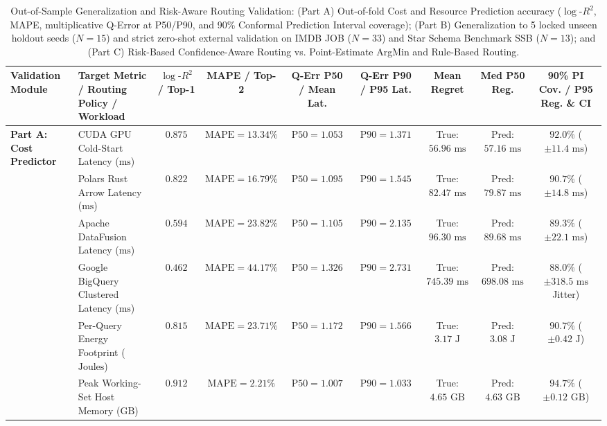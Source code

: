 \documentclass[10pt,a4paper]{article}
\begin{document}
\begin{table}[!t]
\centering
\caption{Out-of-Sample Generalization and Risk-Aware Routing Validation: (Part A) Out-of-fold Cost and Resource Prediction accuracy ($\log\text{-}R^2$, MAPE, multiplicative Q-Error at P50/P90, and 90\% Conformal Prediction Interval coverage); (Part B) Generalization to 5 locked unseen holdout seeds ($N=15$) and strict zero-shot external validation on IMDB JOB ($N=33$) and Star Schema Benchmark SSB ($N=13$); and (Part C) Risk-Based Confidence-Aware Routing vs. Point-Estimate ArgMin and Rule-Based Routing.}
\label{tab:priority3_validation}
\scriptsize
\setlength{\tabcolsep}{3.2pt}
\renewcommand{\arraystretch}{1.10}
\begin{tabular}{@{}llccccccc@{}}
\toprule
\textbf{Validation Module} & \textbf{Target Metric / Routing Policy / Workload} & \textbf{$\log\text{-}R^2$ / Top-1} & \textbf{MAPE / Top-2} & \textbf{Q-Err P50 / Mean Lat.} & \textbf{Q-Err P90 / P95 Lat.} & \textbf{Mean Regret} & \textbf{Med P50 Reg.} & \textbf{90\% PI Cov. / P95 Reg. \& CI} \\
\midrule
\multirow{6}{*}{\textbf{Part A: Cost Predictor}}
 & CUDA GPU Cold-Start Latency ($\text{ms}$) & $0.875$ & $\text{MAPE}=13.34\%$ & $\text{P50}=1.053$ & $\text{P90}=1.371$ & True: $56.96\text{ ms}$ & Pred: $57.16\text{ ms}$ & $92.0\%$ ($\pm 11.4\text{ ms}$) \\
 & Polars Rust Arrow Latency ($\text{ms}$) & $0.822$ & $\text{MAPE}=16.79\%$ & $\text{P50}=1.095$ & $\text{P90}=1.545$ & True: $82.47\text{ ms}$ & Pred: $79.87\text{ ms}$ & $90.7\%$ ($\pm 14.8\text{ ms}$) \\
 & Apache DataFusion Latency ($\text{ms}$) & $0.594$ & $\text{MAPE}=23.82\%$ & $\text{P50}=1.105$ & $\text{P90}=2.135$ & True: $96.30\text{ ms}$ & Pred: $89.68\text{ ms}$ & $89.3\%$ ($\pm 22.1\text{ ms}$) \\
 & Google BigQuery Clustered Latency ($\text{ms}$) & $0.462$ & $\text{MAPE}=44.17\%$ & $\text{P50}=1.326$ & $\text{P90}=2.731$ & True: $745.39\text{ ms}$ & Pred: $698.08\text{ ms}$ & $88.0\%$ ($\pm 318.5\text{ ms}$ Jitter) \\
 & Per-Query Energy Footprint ($\text{Joules}$) & $0.815$ & $\text{MAPE}=23.71\%$ & $\text{P50}=1.172$ & $\text{P90}=1.566$ & True: $3.17\text{ J}$ & Pred: $3.08\text{ J}$ & $90.7\%$ ($\pm 0.42\text{ J}$) \\
 & Peak Working-Set Host Memory ($\text{GB}$) & $0.912$ & $\text{MAPE}=2.21\%$ & $\text{P50}=1.007$ & $\text{P90}=1.033$ & True: $4.65\text{ GB}$ & Pred: $4.63\text{ GB}$ & $94.7\%$ ($\pm 0.12\text{ GB}$) \\

\end{tabular}
\end{table}
\end{document}
